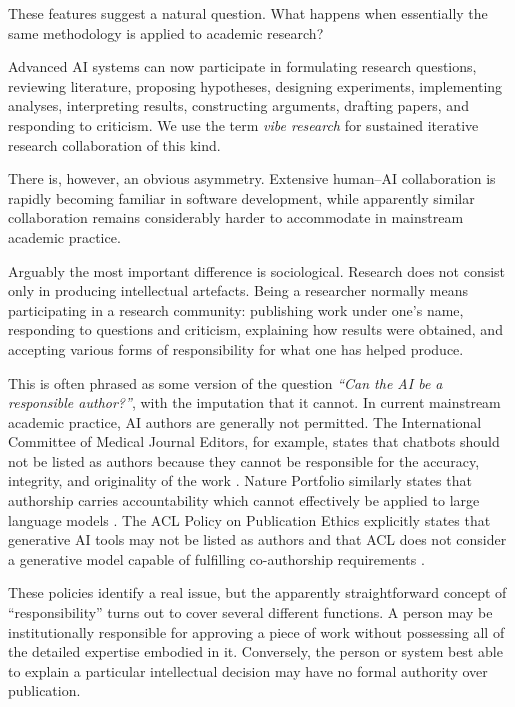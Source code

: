 These features suggest a natural question. What happens when essentially the same methodology is applied to academic research?

Advanced AI systems can now participate in formulating research questions, reviewing literature, proposing hypotheses, designing experiments, implementing analyses, interpreting results, constructing arguments, drafting papers, and responding to criticism. We use the term \emph{vibe research} for sustained iterative research collaboration of this kind.

There is, however, an obvious asymmetry. Extensive human--AI collaboration is rapidly becoming familiar in software development, while apparently similar collaboration remains considerably harder to accommodate in mainstream academic practice.

Arguably the most important difference is sociological. Research does not consist only in producing intellectual artefacts. Being a researcher normally means participating in a research community: publishing work under one's name, responding to questions and criticism, explaining how results were obtained, and accepting various forms of responsibility for what one has helped produce.

This is often phrased as some version of the question \emph{``Can the AI be a responsible author?''}, with the imputation that it cannot. In current mainstream academic practice, AI authors are generally not permitted. The International Committee of Medical Journal Editors, for example, states that chatbots should not be listed as authors because they cannot be responsible for the accuracy, integrity, and originality of the work \citep{icmje2026ai}. Nature Portfolio similarly states that authorship carries accountability which cannot effectively be applied to large language models \citep{nature2026ai}. The ACL Policy on Publication Ethics explicitly states that generative AI tools may not be listed as authors and that ACL does not consider a generative model capable of fulfilling co-authorship requirements \citep{acl2026policy}.

These policies identify a real issue, but the apparently straightforward concept of ``responsibility'' turns out to cover several different functions. A person may be institutionally responsible for approving a piece of work without possessing all of the detailed expertise embodied in it. Conversely, the person or system best able to explain a particular intellectual decision may have no formal authority over publication.


